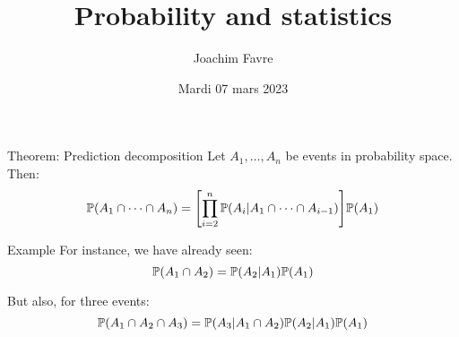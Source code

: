 \documentclass[a4paper]{article}
\title{Probability and statistics}
\author{Joachim Favre}
\date{Mardi 07 mars 2023}
\begin{document}
\maketitle


\begin{parag}{Theorem: Prediction decomposition}
    Let $A_1, \ldots, A_n$ be events in probability space. Then: 
    \[\prob\left(A_1 \cap \cdots \cap A_n\right) = \left[\prod_{i=2}^{n} \prob\left(A_i | A_1 \cap \cdots \cap A_{i-1}\right)\right] \prob\left(A_1\right)\]

    \begin{subparag}{Example}
        For instance, we have already seen: 
        \[\prob\left(A_1 \cap A_2\right) = \prob\left(A_2 | A_{1}\right)\prob\left(A_1\right)\]

        But also, for three events: 
        \[\prob\left(A_1 \cap A_2 \cap A_3\right) = \prob\left(A_3 | A_1 \cap A_2\right)\prob\left(A_2 | A_1\right)\prob\left(A_1\right)\]
    \end{subparag}
\end{parag}
\end{document}
